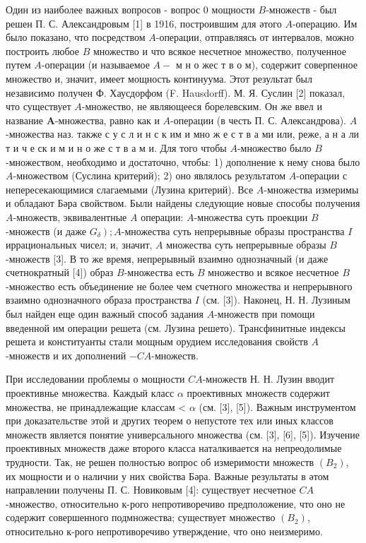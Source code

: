 \documentclass[10pt]{article}
\begin{document}
Один из наиболее важных вопросов - вопрос 0 мощности $B$-множеств - был решен П. С. Александровым [1] в 1916, построившим для әтого $A$-операцию. Им было показано, что посредством $A$-операции, отправляясь от интервалов, можно построить любое $B$ множество и что всякое несчетное множество, полученное путем $A$-операции (и называемое $A-$ м н $о$ жес т в о м), содержит соверпенное множество и, значит, имеет мощность континуума. Этот результат был независимо получен Ф. Хаусдорфом (F. Hausdorff). М. Я. Суслин [2] показал, что существует $A$-множество, не являющееся борелевским. Он же ввел и название $\boldsymbol{A}$-множества, равно как и $A$-операции (в честь П. С. Александрова). $A$-множества наз. также с у с л и н с к им и мно ж е с т в а ми или, реже, а н а ли т и ч е ск и м и н о же с т в а м и. Для того чтобы $A$-множество было $B$-множеством, необходимо и достаточно, чтобы: 1) дополнение к нему снова было $A$-множеством (Суслина критерий); 2) оно являлось результатом $A$-операции с непересекающимися слагаемыми (Лузина критерий). Все $A$-множества измеримы и обладают Бәра свойством. Были найдены следующие новые способы получения $A$-множеств, эквивалентные $A$ операции: $A$-множества суть проекции $B$-множеств (и даже $\left.G_{\delta}\right) ; A$-множества суть непрерывные образы пространства $I$ иррациональных чисел; и, значит, $A$ множества суть непрерывные образы $B$-множеств [3]. В то же время, непрерывный взаимно однозначный (и даже счетнократный [4]) образ $B$-множества есть $B$ множество и всякое несчетное $B$-множество есть объединение не более чем счетного множества и непрерывного взаимно однозначного образа пространства $I$ (см. [3]). Наконец, Н. Н. Лузиным был найден еще один важный способ задания $A$-множеств при помощи введенной им операции решета (см. Лузина решето). Трансфинитные индексы решета и конституанты стали мощным орудием исследования свойств $A$-множеств и их дополнений $-C A$-множеств.



При исследовании проблемы о мощности $C A$-множеств Н. Н. Лузин вводит проективнье множества. Каждый класс $\alpha$ проективных множеств содержит множества, не принадлежащие классам < $\alpha$ (см. [3], [5]). Важным инструментом при доказательстве этой и других теорем о непустоте тех или иных классов множеств является понятие универсального множества (см. [3], [6], [5]). Изучение проективных множеств даже второго класса наталкивается на непреодолимые трудности. Так, не решен полностью вопрос об измеримости множеств $\left(B_{2}\right)$, их мощности и о наличии у них свойства Бәра. Важные результаты в әтом направлении получены П. С. Новиковым [4]: существует несчетное $C A$-множество, относительно к-рого непротиворечиво предположение, что оно не содержит совершенного подмножества; существует множество $\left(B_{2}\right)$, относительно к-рого непротиворечиво утверждение, что оно неизмеримо.
\end{document}
